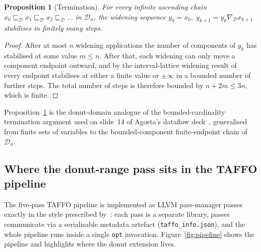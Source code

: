 \documentclass[11pt,a4paper]{article}
\theoremstyle{plain}
\newtheorem{proposition}{Proposition}
\begin{document}
\begin{proposition}[Termination]\label{prop:termination}
For every infinite ascending chain
$x_0 \sqsubseteq_{\mathcal{D}} x_1 \sqsubseteq_{\mathcal{D}} x_2 \sqsubseteq_{\mathcal{D}} \dots$
in $\mathcal{D}_n$, the widening sequence
$y_0 = x_0,\; y_{k+1} = y_k\nabla_{\mathcal{D}} x_{k+1}$
stabilises in finitely many steps.
\end{proposition}
\begin{proof}
After at most $n$ widening applications the number of components of
$y_k$ has stabilised at some value $m\le n$. After that, each widening
can only move a component endpoint outward, and by the
interval-lattice widening result of~\cite[p.~36]{history-ai} every
endpoint stabilises at either a finite value or $\pm\infty$ in a
bounded number of further steps. The total number of steps is
therefore bounded by $n + 2m \le 3n$, which is finite.
\end{proof}

Proposition~\ref{prop:termination} is the donut-domain analogue of the
bounded-cardinality termination argument used on slide~14 of Agosta's
dataflow deck~\cite{cot-dataflow}, generalised from finite sets of
variables to the bounded-component finite-endpoint chain of
$\mathcal{D}_n$.

\subsection{Where the donut-range pass sits in the TAFFO pipeline}
\label{sec:pipeline-place}

The five-pass TAFFO pipeline is implemented as LLVM pass-manager
passes exactly in the style prescribed
by~\cite{lattner-llvm}: each pass is a separate library, passes
communicate via a serialisable metadata artefact
(\texttt{taffo\_info.json}), and the whole pipeline runs inside a
single \texttt{opt} invocation. Figure~\ref{fig:pipeline} shows the
pipeline and highlights where the donut extension lives.
\end{document}
